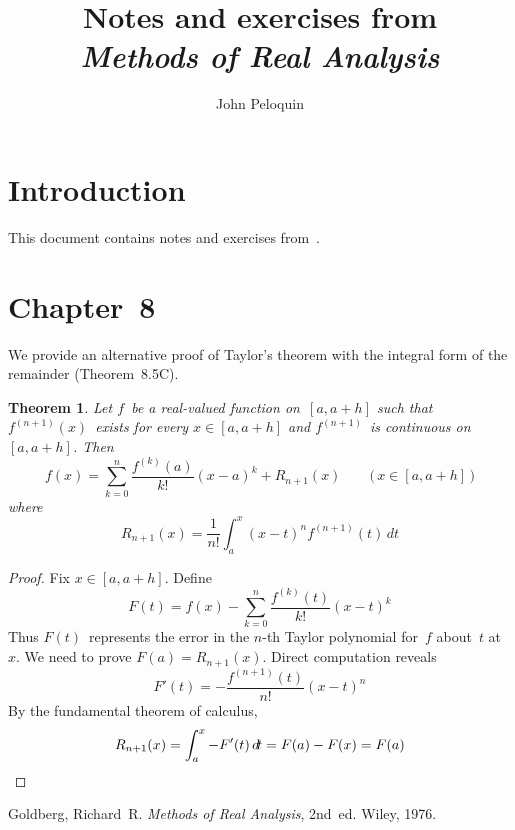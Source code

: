 \documentclass[letterpaper,12pt]{article}
\title{Notes and exercises from\\\textit{Methods of Real Analysis}}
\author{John Peloquin}
\date{}
\newcommand{\dt}{\,d\!t}
\theoremstyle{plain}
\newtheorem*{thm}{Theorem}
\theoremstyle{definition}
\theoremstyle{remark}
\begin{document}
\maketitle

\section*{Introduction}
This document contains notes and exercises from~\cite{goldberg}.

\section*{Chapter~8}
We provide an alternative proof of Taylor's theorem with the integral form of the remainder (Theorem~8.5C).
\begin{thm}
Let \(f\)~be a real-valued function on~\([a,a+h]\) such that \(f^{(n+1)}(x)\)~exists for every \(x\in[a,a+h]\) and \(f^{(n+1)}\)~is continuous on~\([a,a+h]\). Then
\[f(x)=\sum_{k=0}^n\frac{f^{(k)}(a)}{k!}(x-a)^k+R_{n+1}(x)\qquad\bigl(\,x\in[a,a+h]\,\bigr)\]
where
\[R_{n+1}(x)=\frac{1}{n!}\int_a^x(x-t)^nf^{(n+1)}(t)\dt\]
\end{thm}
\begin{proof}
Fix \(x\in[a,a+h]\). Define
\[F(t)=f(x)-\sum_{k=0}^n\frac{f^{(k)}(t)}{k!}(x-t)^k\]
Thus \(F(t)\)~represents the error in the \(n\)-th Taylor polynomial for~\(f\) about~\(t\) at~\(x\). We need to prove \(F(a)=R_{n+1}(x)\). Direct computation reveals
\[F'(t)=-\frac{f^{(n+1)}(t)}{n!}(x-t)^n\]
By the fundamental theorem of calculus,
\[R_{n+1}(x)=\int_a^x-F'(t)\dt=F(a)-F(x)=F(a)\qedhere\]
\end{proof}

\begin{thebibliography}{0}
 Goldberg, Richard~R. \textit{Methods of Real Analysis}, 2nd~ed. Wiley, 1976.
\end{thebibliography}
\end{document}
